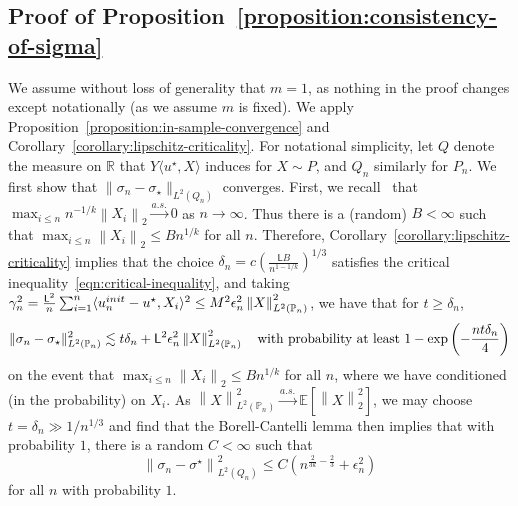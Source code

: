 \documentclass[11pt]{article}
\newcommand{\E}{\mathbb{E}}
\newcommand{\Prb}{\mathbb{P}}
\newcommand{\R}{\mathbb{R}} %
\newcommand{\norm}[1]{\left\|{#1}\right\|} %
\newcommand{\lipconst}{\mathsf{L}}
\newcommand{\ltwo}[1]{\norm{#1}_2} %
\newcommand{\norms}[1]{\|{#1}\|} %
\newcommand{\<}{\langle} %
\renewcommand{\>}{\rangle}
\newcommand{\cas}{\stackrel{a.s.}{\rightarrow}}
\newcommand{\LtwoPn}[1]{\norm{#1}_{L^2(\Prb_n)}}
\newcommand{\LtwoPns}[1]{\norms{#1}_{L^2(\Prb_n)}}
\newcommand{\LtwoQn}[1]{\norm{#1}_{L^2(Q_n)}}
\newcommand{\LtwoQns}[1]{\norms{#1}_{L^2(Q_n)}}
\newcommand{\opt}{^\star}
\newcommand{\subopt}{_\star}
\begin{document}
\subsection{Proof of Proposition~\ref{proposition:consistency-of-sigma}}
\label{sec:proof-consistency-of-sigma}

We assume without loss of generality that $m = 1$, as nothing in the
proof changes except notationally (as we assume $m$ is fixed).
We apply Proposition~\ref{proposition:in-sample-convergence} and
Corollary~\ref{corollary:lipschitz-criticality}.  For
notational simplicity, let $Q$ denote the measure
on $\R$ that $Y \<u\opt, X\>$ induces for $X \sim P$, and $Q_n$ similarly for
$P_n$.
We first show that
$\LtwoQns{\sigma_n - \sigma\subopt}$ converges.  First, we
recall~\cite[Lemma 3]{Owen90} that $\max_{i \le n} n^{-1/k} \ltwo{X_i} \cas
0$ as $n \to \infty$. Thus there is a (random) $B < \infty$ such that
$\max_{i \le n} \ltwo{X_i} \le B n^{1/k}$ for all $n$. Therefore,
Corollary~\ref{corollary:lipschitz-criticality} implies that the choice
$\delta_n = c (\frac{\lipconst B}{n^{1-1/k}})^{1/3}$ satisfies the critical
inequality~\eqref{eqn:critical-inequality}, and taking $\gamma^2_n =
\frac{\lipconst^2}{n} \sum_{i = 1}^n \<\uinit - u\opt, X_i\>^2 \le M^2 \uerror_n^2
\LtwoPn{X}^2$, we have that for $t \ge \delta_n$,
\begin{equation*}
  \LtwoPns{\sigma_n - \sigma\subopt}^2
  \lesssim t \delta_n + \lipconst^2 \uerror_n^2 \LtwoPn{X}^2
  ~~~ \mbox{with~probability~at~least}~
  1 - \exp\left(-\frac{n t \delta_n}{4}\right)
\end{equation*}
on the event that $\max_{i \le n} \ltwo{X_i} \le B n^{1/k}$ for all $n$,
where we have conditioned (in the probability) on $X_i$.
As $\LtwoPn{X}^2 \cas \E[\ltwo{X}^2]$, we may choose
$t = \delta_n \gg 1/n^{1/3}$ and find that the Borell-Cantelli lemma
then implies that with probability $1$, there is a random $C < \infty$
such that
\begin{equation}
  \label{eqn:ltwopn-sigma-converge}
  \LtwoQn{\sigma_n - \sigma\opt}^2 \le C \left(
  n^{\frac{2}{3k} - \frac{2}{3}} + \epsilon_n^2 \right)
\end{equation}
for all $n$ with probability $1$.
\end{document}
